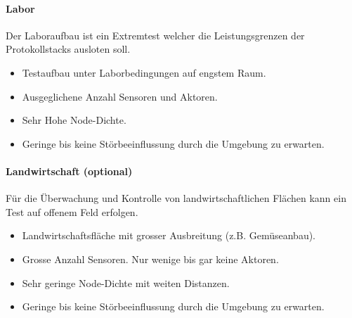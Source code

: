 \paragraph{Labor}
Der Laboraufbau ist ein Extremtest welcher die Leistungsgrenzen der Protokollstacks ausloten soll.
	\begin{itemize}
		\item Testaufbau unter Laborbedingungen auf engstem Raum.
		\item Ausgeglichene Anzahl Sensoren und Aktoren.
		\item Sehr Hohe Node-Dichte.
		\item Geringe bis keine Störbeeinflussung durch die Umgebung zu erwarten.
	\end{itemize}
	
\paragraph{Landwirtschaft (optional)}
Für die Überwachung und Kontrolle von landwirtschaftlichen Flächen kann ein Test auf offenem Feld erfolgen.
	\begin{itemize}
		\item Landwirtschaftsfläche mit grosser Ausbreitung (z.B. Gemüseanbau).
		\item Grosse Anzahl Sensoren. Nur wenige bis gar keine Aktoren.
		\item Sehr geringe Node-Dichte mit weiten Distanzen.
		\item Geringe bis keine Störbeeinflussung durch die Umgebung zu erwarten.
	\end{itemize}







